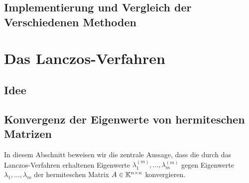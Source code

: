 \documentclass{article}
\begin{document}
\subsection{Implementierung und Vergleich der Verschiedenen Methoden}


\section{Das Lanczos-Verfahren}

\subsection{Idee}

\subsection{Konvergenz der Eigenwerte von hermiteschen Matrizen}

In diesem Abschnitt beweisen wir die zentrale Aussage, dass die durch das Lanczos-Verfahren erhaltenen Eigenwerte $\lambda_1^{(m)},\dots,\lambda_m^{(m)}$ gegen Eigenwerte $\lambda_1,\dots,\lambda_m$ der hermiteschen Matrix $A \in \mathbb{K}^{n \times n}$ konvergieren.

\end{document}
